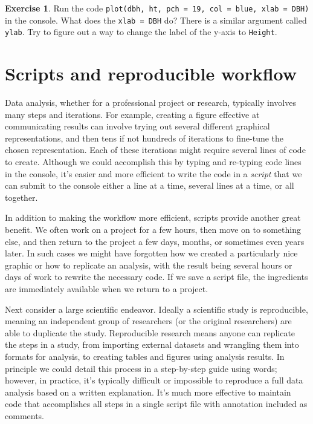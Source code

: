 \documentclass[
  11pt,
]{krantz}
\theoremstyle{definition}
\theoremstyle{definition}
\theoremstyle{definition}
\newtheorem{exercise}{Exercise}[chapter]
\theoremstyle{definition}
\theoremstyle{remark}
\begin{document}
\begin{exercise}
\protect\hypertarget{exr:intro7}{}\label{exr:intro7}Run the code \texttt{plot(dbh,\ ht,\ pch\ =\ 19,\ col\ =\ \textquotesingle{}blue\textquotesingle{},\ xlab\ =\ \textquotesingle{}DBH\textquotesingle{})} in the console. What does the \texttt{xlab\ =\ \textquotesingle{}DBH\textquotesingle{}} do? There is a similar argument called \texttt{ylab}. Try to figure out a way to change the label of the y-axis to \texttt{Height}.
\end{exercise}

\hypertarget{scripts}{%
\chapter{Scripts and reproducible workflow}\label{scripts}}

Data analysis, whether for a professional project or research, typically involves many steps and iterations. For example, creating a figure effective at communicating results can involve trying out several different graphical representations, and then tens if not hundreds of iterations to fine-tune the chosen representation. Each of these iterations might require several lines of code to create. Although we could accomplish this by typing and re-typing code lines in the console, it's easier and more efficient to write the code in a \emph{script} that we can submit to the console either a line at a time, several lines at a time, or all together.

In addition to making the workflow more efficient, scripts provide another great benefit. We often work on a project for a few hours, then move on to something else, and then return to the project a few days, months, or sometimes even years later. In such cases we might have forgotten how we created a particularly nice graphic or how to replicate an analysis, with the result being several hours or days of work to rewrite the necessary code. If we save a script file, the ingredients are immediately available when we return to a project.

Next consider a large scientific endeavor. Ideally a scientific study is reproducible, meaning an independent group of researchers (or the original researchers) are able to duplicate the study. Reproducible research means anyone can replicate the steps in a study, from importing external datasets and wrangling them into formats for analysis, to creating tables and figures using analysis results. In principle we could detail this process in a step-by-step guide using words; however, in practice, it's typically difficult or impossible to reproduce a full data analysis based on a written explanation. It's much more effective to maintain code that accomplishes all steps in a single script file with annotation included as comments.
\end{document}
